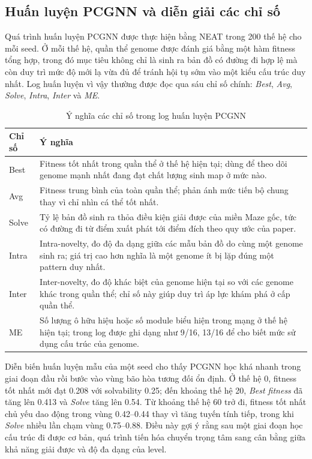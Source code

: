 \subsection{Huấn luyện PCGNN và diễn giải các chỉ số}

Quá trình huấn luyện PCGNN được thực hiện bằng NEAT trong 200 thế hệ cho mỗi seed. Ở mỗi thế hệ, quần thể genome được đánh giá bằng một hàm fitness tổng hợp, trong đó mục tiêu không chỉ là sinh ra bản đồ có đường đi hợp lệ mà còn duy trì mức độ mới lạ vừa đủ để tránh hội tụ sớm vào một kiểu cấu trúc duy nhất. Log huấn luyện vì vậy thường được đọc qua sáu chỉ số chính: \textit{Best}, \textit{Avg}, \textit{Solve}, \textit{Intra}, \textit{Inter} và \textit{ME}.

\begin{table}[H]
    \centering
    \small
    \caption{Ý nghĩa các chỉ số trong log huấn luyện PCGNN}
    \label{tab:pcgnn_training_metrics}
    \begin{tabular}{|p{2.2cm}|p{10.6cm}|}
        \hline
        \textbf{Chỉ số} & \textbf{Ý nghĩa} \\
        \hline
        Best & Fitness tốt nhất trong quần thể ở thế hệ hiện tại; dùng để theo dõi genome mạnh nhất đang đạt chất lượng sinh map ở mức nào. \\
        \hline
        Avg & Fitness trung bình của toàn quần thể; phản ánh mức tiến bộ chung thay vì chỉ nhìn cá thể tốt nhất. \\
        \hline
        Solve & Tỷ lệ bản đồ sinh ra thỏa điều kiện giải được của miền Maze gốc, tức có đường đi từ điểm xuất phát tới điểm đích theo quy ước của paper. \\
        \hline
        Intra & Intra-novelty, đo độ đa dạng giữa các mẫu bản đồ do cùng một genome sinh ra; giá trị cao hơn nghĩa là một genome ít bị lặp đúng một pattern duy nhất. \\
        \hline
        Inter & Inter-novelty, đo độ khác biệt của genome hiện tại so với các genome khác trong quần thể; chỉ số này giúp duy trì áp lực khám phá ở cấp quần thể. \\
        \hline
        ME & Số lượng ô hữu hiệu hoặc số module biểu hiện trong mạng ở thế hệ hiện tại; trong log được ghi dạng như 9/16, 13/16 để cho biết mức sử dụng cấu trúc của genome. \\
        \hline
    \end{tabular}
\end{table}

Diễn biến huấn luyện mẫu của một seed cho thấy PCGNN học khá nhanh trong giai đoạn đầu rồi bước vào vùng bão hòa tương đối ổn định. Ở thế hệ 0, fitness tốt nhất mới đạt 0.208 với solvability 0.25; đến khoảng thế hệ 20, \textit{Best fitness} đã tăng lên 0.413 và \textit{Solve} tăng lên 0.54. Từ khoảng thế hệ 60 trở đi, fitness tốt nhất chủ yếu dao động trong vùng 0.42--0.44 thay vì tăng tuyến tính tiếp, trong khi \textit{Solve} nhiều lần chạm vùng 0.75--0.88. Điều này gợi ý rằng sau một giai đoạn học cấu trúc đi được cơ bản, quá trình tiến hóa chuyển trọng tâm sang cân bằng giữa khả năng giải được và độ đa dạng của level.

